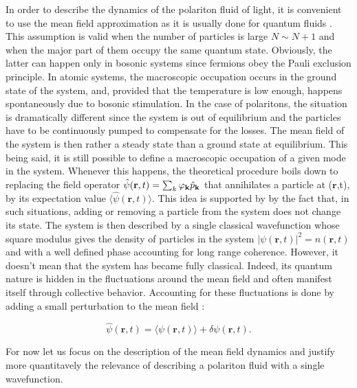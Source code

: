 In order to describe the dynamics of the polariton fluid of light, it is convenient to use the mean field approximation as it is usually done for quantum fluids \cite{pitaevskij_bose-einstein_2016}. This assumption is valid when the number of particles is large $N \sim N+1$ and when the major part of them occupy the same quantum state.
Obviously, the latter can happen only in bosonic systems since fermions obey the Pauli exclusion principle. In atomic systems, the macroscopic occupation occurs in the ground state of the system, and, provided that the temperature is low enough, happens spontaneously due to bosonic stimulation. In the case of polaritons, the situation is dramatically different since the system is out of equilibrium and the particles have to be continuously pumped to compensate for the losses.
The mean field of the system is then rather a steady state than a ground state at equilibrium. This being said, it is still possible to define a macroscopic occupation of a given mode in the system.
Whenever this happens, the theoretical procedure boils down to replacing the field operator $\hat{\psi}(\mathbf{r},t)= \sum_{k}\varphi_{\mathbf{k}} \hat{p}_{\mathbf{k}}$ that annihilates a particle at ($\mathbf{r}$,t), by its expectation value $\langle \hat{\psi}(\mathbf{r},t)\rangle$. This idea is supported by
by the fact that, in such situations, adding or removing a particle from the system does not change its state. The system is then described by a single classical wavefunction whose square modulus gives the density of particles in the system $|\psi(\mathbf{r},t)|^2= n(\mathbf{r},t)$ and with a well defined phase 
accounting for long range coherence. However, it doesn't mean that the system has became fully classical. Indeed, its quantum nature is hidden in the fluctuations around the mean field and often manifest itself through collective behavior. Accounting for these fluctuations is done 
by adding a small perturbation to the mean field : 

\begin{equation}
    \label{eq:mean_field_and_fluctuation}
    \hat{\psi}(\mathbf{r},t) = \langle \psi(\mathbf{r},t) \rangle + \delta \psi(\mathbf{r},t).
\end{equation}

For now let us focus on the description of the mean field dynamics and justify more quantitavely the relevance of describing a polariton fluid with a single wavefunction.

\bigskip

